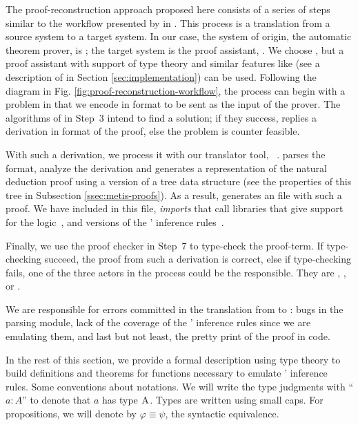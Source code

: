 \documentclass[../main.tex]{subfiles}
\begin{document}
The proof-reconstruction approach proposed here consists of a series
of steps similar to the workflow presented by \citeauthor{sultana2015} in
\cite{sultana2015}. This process is a translation from a source
system to a target system. In our case, the system of origin, the
automatic theorem prover, is \Metis; the target system is the proof
assistant, \Agda. We choose \Agda, but a proof assistant with
support of type theory and similar features like \Agda
(see a description of \Agda in Section
\ref{sec:implementation}) can be used.
Following the diagram in Fig.
\ref{fig:proof-reconstruction-workflow}, the process can begin with
a problem in \CPL that we encode in \TPTP format to be sent as the
input of the \Metis prover.
The algorithms of \Metis in Step~3 intend to find
a solution; if they success, \Metis replies a derivation in \TSTP
format of the proof, else the problem is counter feasible.

With such a derivation, we process it with our \Haskell translator
tool, \Athena~\cite{Athena}.
\Athena parses the \TSTP format, analyze the
derivation and generates a representation of the natural deduction
proof using a version of a tree data structure (see the properties
of this tree in Subsection \ref{ssec:metis-proofs}). As a result,
\Athena generates an \Agda file with such a proof. We have included
in this file, \emph{imports} that call \Agda libraries that give
support for the logic~\cite{AgdaProp}, and versions of the \Metis'
inference rules~\cite{AgdaMetis}.

Finally, we use the proof checker in Step~7 to type-check the
proof-term. If type-checking succeed, the proof from such a \TSTP
derivation is correct, else if type-checking fails, one of the three
actors in the process could be the responsible.
They are \Metis, \Athena, or \Agda.

We are responsible for errors committed in the translation from
\TSTP to \Agda: bugs in the parsing module, lack of the coverage of
the \Metis' inference rules since we are emulating them, and last
but not least, the pretty print of the proof in \Agda code.

In the rest of this section, we provide a formal description using
type theory to build definitions and theorems for functions
necessary to emulate \Metis' inference rules.
Some conventions about notations. We will write the
type judgments with ``$a : A$'' to denote that $a$ has type
$\textsc{A}$. Types are written using small caps.
For propositions, we will denote by $φ ≡ ψ$, the syntactic
equivalence.
\end{document}
